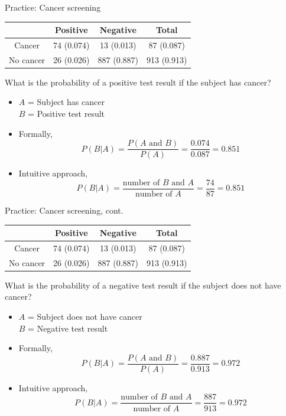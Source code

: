 \documentclass[xcolor=table]{beamer}
\begin{document}
\begin{frame}{Practice: Cancer screening}
\begin{block}{}
{\centering \renewcommand{\arraystretch}{1}
\begin{tabular}{c | c  c | c}
 & Positive & Negative & Total \\
\hline
Cancer & 74 (0.074) & 13 (0.013) & 87 (0.087)\\
No cancer & 26 (0.026) & 887 (0.887) & 913 (0.913)\\
\end{tabular}\par
\renewcommand{\arraystretch}{1.5}
}
\end{block}

\begin{exampleblock}{}
What is the probability of a positive test result if the subject has cancer?
\begin{itemize}
\pause
\item $A$ = Subject has cancer\\
$B$ = Positive test result
\pause
\item Formally,
\[P(B|A) = \frac {P(A \text{ and } B)}{P(A)} = \frac {0.074}{0.087} = 0.851\]
\vspace*{-\baselineskip}\pause
\item Intuitive approach,
\[ P(B|A) = \frac{\text{number of $B$ and $A$}}{\text{number of $A$}} = \frac {74}{87} = 0.851\]
\end{itemize}
\end{exampleblock}
\end{frame}

\begin{frame}{Practice: Cancer screening, cont.}
\begin{block}{}
{\centering \renewcommand{\arraystretch}{1}
\begin{tabular}{c | c  c | c}
 & Positive & Negative & Total \\
\hline
Cancer & 74 (0.074) & 13 (0.013) & 87 (0.087)\\
No cancer & 26 (0.026) & 887 (0.887) & 913 (0.913)\\
\end{tabular}\par
\renewcommand{\arraystretch}{1.5}
}
\end{block}

\begin{exampleblock}{}
What is the probability of a negative test result if the subject does not have cancer?
\begin{itemize}
\pause
\item $A$ = Subject does not have cancer\\
$B$ = Negative test result
\pause
\item Formally,
\[P(B|A) = \frac {P(A \text{ and } B)}{P(A)} = \frac {0.887}{0.913} = 0.972\]
\vspace*{-\baselineskip}\pause
\item Intuitive approach,
\[ P(B|A) = \frac{\text{number of $B$ and $A$}}{\text{number of $A$}} = \frac {887}{913} = 0.972\]
\end{itemize}
\end{exampleblock}
\end{frame}
\end{document}

